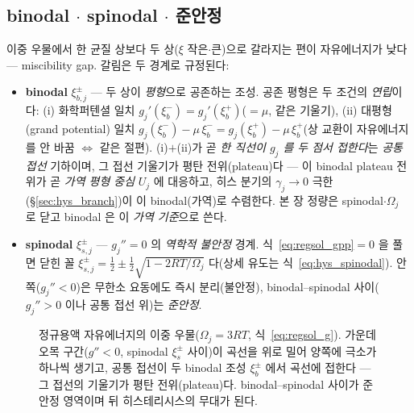\documentclass[11pt,a4paper]{article}
\begin{document}
\subsection{binodal $\cdot$ spinodal $\cdot$ 준안정}
이중 우물에서 한 균질 상보다 두 상($\xi$ 작은$\cdot$큰)으로 갈라지는 편이 자유에너지가 낮다 — miscibility gap.
갈림은 두 경계로 규정된다:
\begin{itemize}[leftmargin=1.4em,itemsep=2pt]
\item \textbf{binodal} $\xi_{b,j}^\pm$ — 두 상이 \emph{평형}으로 공존하는 조성. 공존 평형은 두 조건의 \emph{연립}이다:
  (i) 화학퍼텐셜 일치 $g_j'(\xi_b^-)=g_j'(\xi_b^+)$($=\mu$, 같은 기울기), (ii) 대평형(grand potential) 일치
  $g_j(\xi_b^-)-\mu\,\xi_b^-=g_j(\xi_b^+)-\mu\,\xi_b^+$(상 교환이 자유에너지를 안 바꿈 $\Leftrightarrow$ 같은 절편).
  (i)$+$(ii)가 곧 \emph{한 직선이 $g_j$ 를 두 점서 접한다}는 \emph{공통 접선} 기하이며, 그 접선 기울기가 평탄
  전위(plateau)다 — 이 binodal plateau 전위가 곧 \emph{가역 평형 중심} $U_j$ 에 대응하고, 히스 분기의 $\gamma_j\to0$
  극한(\S\ref{sec:hys_branch})이 이 binodal(가역)로 수렴한다. 본 장 정량은 spinodal$\cdot$$\Omega_j$ 로 닫고 binodal 은
  이 \emph{가역 기준}으로 쓴다.
\item \textbf{spinodal} $\xi_{s,j}^\pm$ — $g_j''=0$ 의 \emph{역학적 불안정} 경계. 식~\eqref{eq:regsol_gpp}$=0$ 을 풀면
  닫힌 꼴 $\xi_{s,j}^\pm=\tfrac12\pm\tfrac12\sqrt{1-2RT/\Omega_j}$ 다(상세 유도는 식~\eqref{eq:hys_spinodal}).
  안쪽($g_j''<0$)은 무한소 요동에도 즉시 분리(불안정), binodal--spinodal 사이($g_j''>0$ 이나 공통 접선 위)는 \emph{준안정}.
\end{itemize}
\begin{figure}[t]
\centering
{}
\caption{정규용액 자유에너지의 이중 우물($\Omega_j=3RT$, 식~\eqref{eq:regsol_g}). 가운데 오목 구간($g''<0$,
spinodal $\xi_s^\pm$ 사이)이 곡선을 위로 밀어 양쪽에 극소가 하나씩 생기고, 공통 접선이 두 binodal 조성
$\xi_b^\pm$ 에서 곡선에 접한다 — 그 접선의 기울기가 평탄 전위(plateau)다. binodal--spinodal 사이가 준안정
영역이며 뒤 히스테리시스의 무대가 된다.}
\label{fig:doublewell}
\end{figure}
\end{document}
